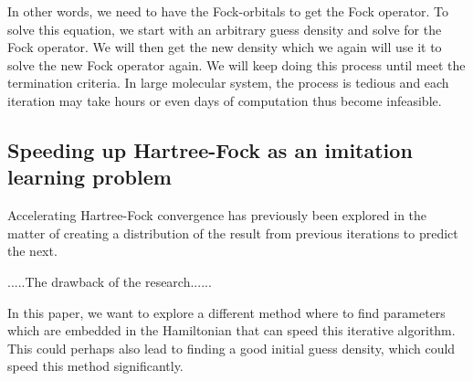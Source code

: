 \documentclass[twoside]{article}
\begin{document}


In other words, we need to have the Fock-orbitals to get the Fock operator. To solve this equation, we start with an arbitrary guess density and solve for the Fock operator. We will then get the new density which we again will use it to solve the new Fock operator again. We will keep doing this process until meet the termination criteria. In large molecular system, the process is tedious and each iteration may take hours or even days of computation thus become infeasible.

\subsection{Speeding up Hartree-Fock as an imitation learning problem}


Accelerating Hartree-Fock convergence has previously been explored in the matter of creating a distribution of the result from previous iterations to predict the next\cite{Pulay1980}. 

.....The drawback of the research......

In this paper,
we want to explore a different method where to find parameters which are embedded in the Hamiltonian that can speed this iterative algorithm. This could perhaps also lead to finding a good initial guess density, which could speed this method significantly. 






\end{document}
